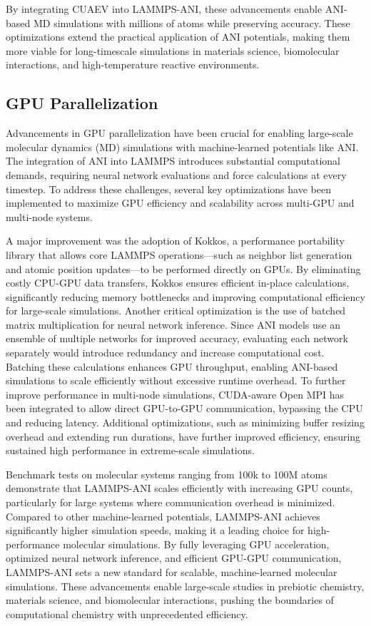 By integrating CUAEV into LAMMPS-ANI, these advancements enable ANI-based MD simulations with millions of atoms while preserving accuracy. These optimizations extend the practical application of ANI potentials, making them more viable for long-timescale simulations in materials science, biomolecular interactions, and high-temperature reactive environments.

\subsection{GPU Parallelization}
\label{subsec:lammps-ani-gpu-parallelization}

Advancements in GPU parallelization have been crucial for enabling large-scale molecular dynamics (MD) simulations with machine-learned potentials like ANI. The integration of ANI into LAMMPS introduces substantial computational demands, requiring neural network evaluations and force calculations at every timestep. To address these challenges, several key optimizations have been implemented to maximize GPU efficiency and scalability across multi-GPU and multi-node systems.

A major improvement was the adoption of Kokkos, 
a performance portability library that allows core LAMMPS operations—such as neighbor list generation and atomic position updates—to be performed directly on GPUs. By eliminating costly CPU-GPU data transfers, Kokkos ensures efficient in-place calculations, significantly reducing memory bottlenecks and improving computational efficiency for large-scale simulations. Another critical optimization is the use of batched matrix multiplication for neural network inference. Since ANI models use an ensemble of multiple networks for improved accuracy, evaluating each network separately would introduce redundancy and increase computational cost. Batching these calculations enhances GPU throughput, enabling ANI-based simulations to scale efficiently without excessive runtime overhead. To further improve performance in multi-node simulations, CUDA-aware Open MPI has been integrated to allow direct GPU-to-GPU communication, bypassing the CPU and reducing latency. Additional optimizations, such as minimizing buffer resizing overhead and extending run durations, have further improved efficiency, ensuring sustained high performance in extreme-scale simulations.

Benchmark tests on molecular systems ranging from 100k to 100M atoms demonstrate that LAMMPS-ANI scales efficiently with increasing GPU counts, particularly for large systems where communication overhead is minimized. Compared to other machine-learned potentials, LAMMPS-ANI achieves significantly higher simulation speeds, making it a leading choice for high-performance molecular simulations. By fully leveraging GPU acceleration, optimized neural network inference, and efficient GPU-GPU communication, LAMMPS-ANI sets a new standard for scalable, machine-learned molecular simulations. These advancements enable large-scale studies in prebiotic chemistry, materials science, and biomolecular interactions, pushing the boundaries of computational chemistry with unprecedented efficiency.

